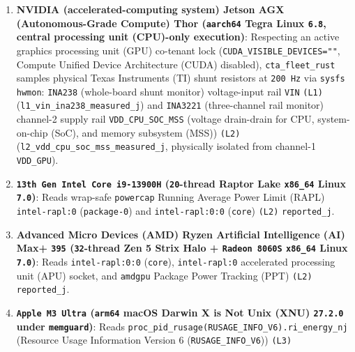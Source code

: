 \documentclass[10pt,letterpaper]{article}
\providecommand{\tightlist}{\setlength{\itemsep}{1pt}\setlength{\parskip}{0pt}}
\begin{document}
\begin{enumerate}
\def\labelenumi{\arabic{enumi}.}
\tightlist
\item
  \textbf{NVIDIA (accelerated-computing system) Jetson AGX
  (Autonomous-Grade Compute) Thor (\texttt{aarch64} Tegra Linux
  \texttt{6.8}, central processing unit (CPU)-only execution)}:
  Respecting an active graphics processing unit (GPU) co-tenant lock
  (\texttt{CUDA\_\allowbreak{}VISIBLE\_\allowbreak{}DEVICES=""}, Compute Unified Device
  Architecture (CUDA) disabled), \texttt{cta\_\allowbreak{}fleet\_\allowbreak{}rust} samples
  physical Texas Instruments (TI) shunt resistors at \texttt{200\ Hz}
  via \texttt{sysfs} \texttt{hwmon}: \texttt{INA238} (whole-board shunt
  monitor) voltage-input rail \texttt{VIN} \texttt{(L1)}
  (\texttt{l1\_\allowbreak{}vin\_\allowbreak{}ina238\_\allowbreak{}measured\_\allowbreak{}j}) and \texttt{INA3221}
  (three-channel rail monitor) channel-2 supply rail
  \texttt{VDD\_\allowbreak{}CPU\_\allowbreak{}SOC\_\allowbreak{}MSS} (voltage drain-drain for CPU,
  system-on-chip (SoC), and memory subsystem (MSS)) \texttt{(L2)}
  (\texttt{l2\_\allowbreak{}vdd\_\allowbreak{}cpu\_\allowbreak{}soc\_\allowbreak{}mss\_\allowbreak{}measured\_\allowbreak{}j}, physically isolated
  from channel-1 \texttt{VDD\_GPU}).
\item
  \textbf{\texttt{13th\ Gen\ Intel\ Core\ i9-\allowbreak{}13900H} (\texttt{20}-thread
  Raptor Lake \texttt{x86\_64} Linux \texttt{7.0})}: Reads wrap-safe
  \texttt{powercap} Running Average Power Limit (RAPL)
  \texttt{intel-\allowbreak{}rapl:0} (\texttt{package-0}) and \texttt{intel-\allowbreak{}rapl:0:0}
  (\texttt{core}) \texttt{(L2)} \texttt{reported\_\allowbreak{}j}.
\item
  \textbf{Advanced Micro Devices (AMD) Ryzen Artificial Intelligence
  (AI) Max+ \texttt{395} (\texttt{32}-thread Zen 5 Strix Halo +
  \texttt{Radeon\ 8060S} \texttt{x86\_64} Linux \texttt{7.0})}: Reads
  \texttt{intel-\allowbreak{}rapl:0:0} (\texttt{core}), \texttt{intel-\allowbreak{}rapl:0}
  accelerated processing unit (APU) socket, and \texttt{amdgpu} Package
  Power Tracking (PPT) \texttt{(L2)} \texttt{reported\_\allowbreak{}j}.
\item
  \textbf{\texttt{Apple\ M3\ Ultra} (\texttt{arm64} macOS Darwin X is
  Not Unix (XNU) \texttt{27.2.0} under \texttt{memguard})}: Reads
  \texttt{proc\_\allowbreak{}pid\_\allowbreak{}rusage(\allowbreak{}RUSAGE\_\allowbreak{}INFO\_\allowbreak{}V6).\allowbreak{}ri\_\allowbreak{}energy\_\allowbreak{}nj} (Resource
  Usage Information Version 6 (\texttt{RUSAGE\_\allowbreak{}INFO\_\allowbreak{}V6})) \texttt{(L3)}

\end{enumerate}
\end{document}
